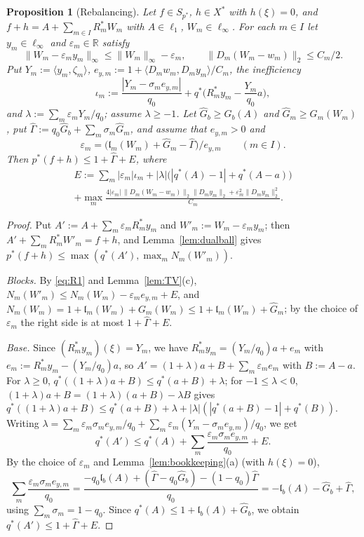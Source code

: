 \documentclass[10pt]{amsart}
\newtheorem{proposition}[theorem]{Proposition}
\theoremstyle{definition}
\theoremstyle{remark}
\newcommand{\R}{\mathbb R}
\newcommand{\ip}[2]{\langle #1,#2\rangle}
\newcommand{\lin}{\mathfrak l}
\begin{document}
\begin{proposition}[Rebalancing]\label{prop:rebalancing}
Let $f\in S_{p^*}$, $h\in X^*$ with $h(\xi)=0$, and
$f+h=A+\sum_{m\in I}R_m^*W_m$ with $A\in\ell_1$, $W_m\in\ell_\infty$.  For
each $m\in I$ let $y_m\in\ell_\infty$ and $\varepsilon_m\in\R$ satisfy
\begin{equation}\label{eq:R1}
 \|W_m-\varepsilon_my_m\|_\infty\le\|W_m\|_\infty-\varepsilon_m,\qquad
 \|D_m(W_m-w_m)\|_2\le C_m/2 .
\end{equation}
Put $Y_m:=\ip{y_m}{\zeta_m}$, $e_{y,m}:=1+\ip{D_mw_m}{D_my_m}/C_m$, the
\emph{inefficiency}
\[
 \iota_m:=\frac{|Y_m-\sigma_me_{y,m}|}{q_0}+q^*\Big(R_m^*y_m-\frac{Y_m}{q_0}a
 \Big),
\]
and $\lambda:=\sum_m\varepsilon_mY_m/q_0$; assume $\lambda\ge-1$.  Let
$\hat G_b\ge G_b(A)$ and $\hat G_m\ge G_m(W_m)$, put
$\hat\Gamma:=q_0\hat G_b+\sum_m\sigma_m\hat G_m$, and assume that $e_{y,m}>0$
and
\[
 \varepsilon_m=\big(\lin_m(W_m)+\hat G_m-\hat\Gamma\big)/e_{y,m}\qquad(m\in I).
\]
Then $p^*(f+h)\le1+\hat\Gamma+E$, where
\begin{multline*}
 E:=\sum_m|\varepsilon_m|\iota_m+|\lambda|\big(|q^*(A)-1|+q^*(A-a)\big)\\
 +\max_m\frac{4|\varepsilon_m|\,\|D_m(W_m-w_m)\|_2\|D_my_m\|_2
 +\varepsilon_m^2\|D_my_m\|_2^2}{C_m}.
\end{multline*}
\end{proposition}

\begin{proof}
Put $A':=A+\sum_m\varepsilon_mR_m^*y_m$ and $W'_m:=W_m-\varepsilon_my_m$; then
$A'+\sum_mR_m^*W'_m=f+h$, and Lemma~\ref{lem:dualball} gives
$p^*(f+h)\le\max(q^*(A'),\max_mN_m(W'_m))$.

\emph{Blocks.}  By \eqref{eq:R1} and Lemma~\ref{lem:TV}(c),
$N_m(W'_m)\le N_m(W_m)-\varepsilon_me_{y,m}+E$, and
$N_m(W_m)=1+\lin_m(W_m)+G_m(W_m)\le1+\lin_m(W_m)+\hat G_m$; by the choice of
$\varepsilon_m$ the right side is at most $1+\hat\Gamma+E$.

\emph{Base.}  Since $(R_m^*y_m)(\xi)=Y_m$, we have
$R_m^*y_m=(Y_m/q_0)a+e_m$ with $e_m:=R_m^*y_m-(Y_m/q_0)a$, so
$A'=(1+\lambda)a+B+\sum_m\varepsilon_me_m$ with $B:=A-a$.  For
$\lambda\ge0$, $q^*((1+\lambda)a+B)\le q^*(a+B)+\lambda$; for
$-1\le\lambda<0$, $(1+\lambda)a+B=(1+\lambda)(a+B)-\lambda B$ gives
$q^*((1+\lambda)a+B)\le q^*(a+B)+\lambda+|\lambda|(|q^*(a+B)-1|+q^*(B))$.
Writing $\lambda=\sum_m\varepsilon_m\sigma_me_{y,m}/q_0+\sum_m\varepsilon_m
(Y_m-\sigma_me_{y,m})/q_0$, we get
\[
 q^*(A')\le q^*(A)+\sum_m\frac{\varepsilon_m\sigma_me_{y,m}}{q_0}+E .
\]
By the choice of $\varepsilon_m$ and Lemma~\ref{lem:bookkeeping}(a) (with
$h(\xi)=0$),
\[
 \sum_m\frac{\varepsilon_m\sigma_me_{y,m}}{q_0}
 =\frac{-q_0\lin_b(A)+(\hat\Gamma-q_0\hat G_b)-(1-q_0)\hat\Gamma}{q_0}
 =-\lin_b(A)-\hat G_b+\hat\Gamma,
\]
using $\sum_m\sigma_m=1-q_0$.  Since $q^*(A)\le1+\lin_b(A)+\hat G_b$, we
obtain $q^*(A')\le1+\hat\Gamma+E$.
\end{proof}
\end{document}
